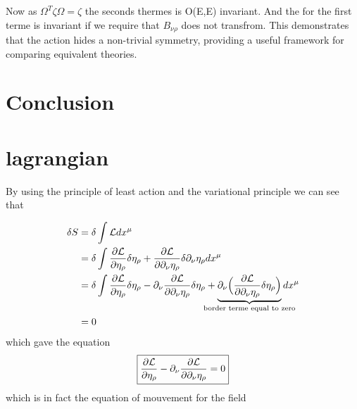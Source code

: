 \documentclass{article}
\begin{document}
Now as $\Omega^T \zeta \Omega = \zeta$ the seconds thermes is O(E,E) invariant. And the for the first terme is invariant if we require that $B_{\nu \rho}$ does not transfrom.
This demonstrates that the action hides a non-trivial symmetry, providing a useful framework for comparing equivalent theories.
 \section{Conclusion}
 
 \printbibliography
 \appendix
 \section{lagrangian}
 By using the principle of least action and the variational principle we can see that


\begin{align*}
    \delta S &= \delta \int \mathcal{L} dx^\mu \\
    & = \delta \int \pdv{\mathcal{L}}{\eta_{\rho}} \delta \eta_{\rho} + \pdv{\mathcal{L}}{\partial_{\nu}\eta_{\rho}} \delta \partial_ \nu \eta_{\rho}  dx^\mu\\
    & = \delta \int \pdv{\mathcal{L}}{\eta_{\rho}} \delta \eta_{\rho}- \partial_ \nu \pdv{\mathcal{L}}{\partial_{\nu}\eta_{\rho}} \delta  \eta_{\rho}  + \underbrace{\partial_ \nu \Big(\pdv{\mathcal{L}}{\partial_{\nu}\eta_{\rho}} \delta  \eta_{\rho}\Big)}_{\mathclap{\text{border terme equal to zero}}}  dx^\mu\\
    & = 0
\end{align*}
which gave the equation
\begin{equation}
    \boxed{\pdv{\mathcal{L}}{\eta_{\rho}} - \partial_ \nu \pdv{\mathcal{L}}{\partial_{\nu}\eta_{\rho}} = 0}
\end{equation}
which is in fact the equation of mouvement for the field
\end{document}
